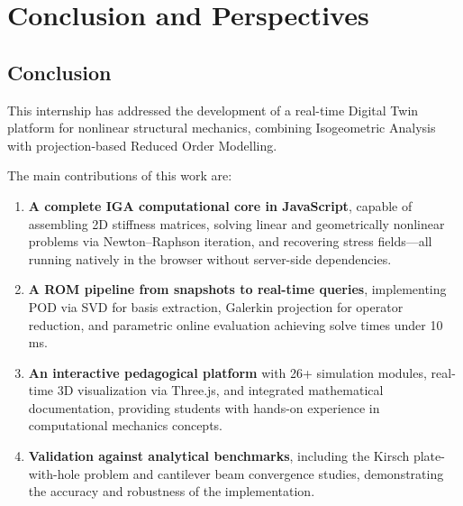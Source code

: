 \chapter*{Conclusion and Perspectives}

\section*{Conclusion}

This internship has addressed the development of a real-time Digital Twin platform for nonlinear structural mechanics, combining Isogeometric Analysis with projection-based Reduced Order Modelling.

The main contributions of this work are:

\begin{enumerate}
    \item \textbf{A complete IGA computational core in JavaScript}, capable of assembling 2D stiffness matrices, solving linear and geometrically nonlinear problems via Newton--Raphson iteration, and recovering stress fields---all running natively in the browser without server-side dependencies.
    
    \item \textbf{A ROM pipeline from snapshots to real-time queries}, implementing POD via SVD for basis extraction, Galerkin projection for operator reduction, and parametric online evaluation achieving solve times under 10\,ms.
    
    \item \textbf{An interactive pedagogical platform} with 26+ simulation modules, real-time 3D visualization via Three.js, and integrated mathematical documentation, providing students with hands-on experience in computational mechanics concepts.
    
    \item \textbf{Validation against analytical benchmarks}, including the Kirsch plate-with-hole problem and cantilever beam convergence studies, demonstrating the accuracy and robustness of the implementation.
\end{enumerate}

